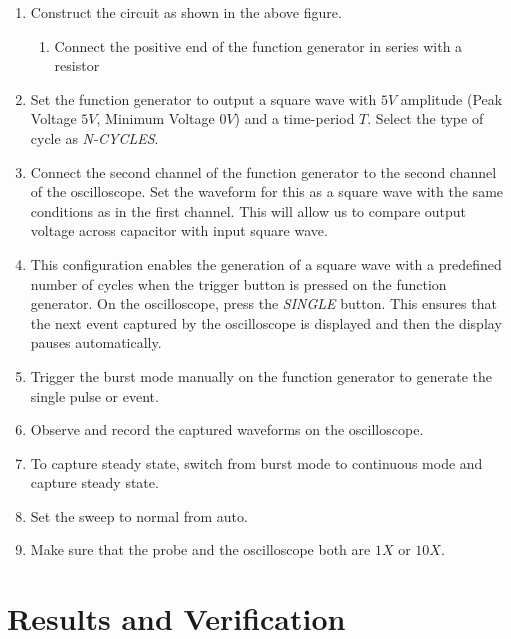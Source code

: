 \documentclass[a4paper,12pt]{article}
\begin{document}
\begin{enumerate}
	\item Construct the circuit as shown in the above figure.
		\begin{enumerate}
			\item Connect the positive end of the function generator in series with a resistor
		\end{enumerate}
	\item Set the function generator to output a square wave with $5V$ amplitude (Peak Voltage $5V$, Minimum Voltage $0V$) and a time-period $T$.
		Select the type of cycle as \textit{N-CYCLES}.
	\item Connect the second channel of the function generator to the second channel of the oscilloscope. Set the waveform for this as a square wave with the same conditions as in the first channel. This will allow us to compare output voltage across capacitor with input square wave.
	\item This configuration enables the generation of a square wave with a predefined number of cycles when the trigger button is pressed on the function generator.
		On the oscilloscope, press the \textit{SINGLE} button. This ensures that the next event captured by the oscilloscope is displayed and then the display pauses automatically.
	\item Trigger the burst mode manually on the function generator to generate the single pulse or event.
	\item Observe and record the captured waveforms on the oscilloscope.
	\item To capture steady state, switch from burst mode to continuous mode and capture steady state.
	\item Set the sweep to normal from auto.
	\item Make sure that the probe and the oscilloscope both are $1X$ or $10X$.
\end{enumerate}

\section*{Results and Verification}
\end{document}

